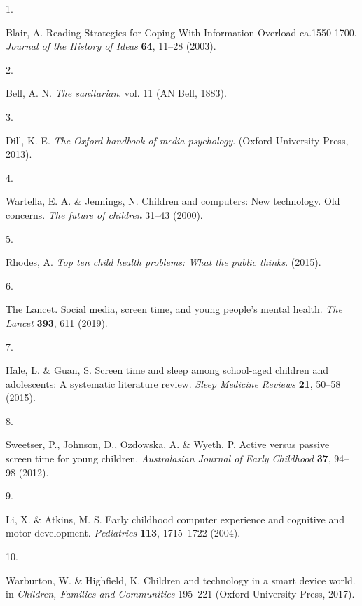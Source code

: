 \documentclass[
  english,
  man]{apa6}
\newlength{\cslhangindent}
\newlength{\csllabelwidth}
\newenvironment{CSLReferences}[2] %
 {%
  \setlength{\parindent}{0pt}
  \ifodd #1 \everypar{\setlength{\hangindent}{\cslhangindent}}\ignorespaces\fi
  \ifnum #2 > 0
  \setlength{\parskip}{#2\baselineskip}
  \fi
 }%
 {}
\newcommand{\CSLLeftMargin}[1]{\parbox[t]{\csllabelwidth}{#1}}
\newcommand{\CSLRightInline}[1]{\parbox[t]{\linewidth - \csllabelwidth}{#1}\break}
\begin{document}
\hypertarget{refs}{}
\begin{CSLReferences}{0}{0}
\leavevmode{}%
\CSLLeftMargin{1. }
\CSLRightInline{Blair, A. Reading {Strategies} for {Coping With Information Overload} ca.1550-1700. \emph{Journal of the History of Ideas} \textbf{64}, 11--28 (2003).}

\leavevmode{}%
\CSLLeftMargin{2. }
\CSLRightInline{Bell, A. N. \emph{The sanitarian}. vol. 11 ({AN Bell}, 1883).}

\leavevmode{}%
\CSLLeftMargin{3. }
\CSLRightInline{Dill, K. E. \emph{The {Oxford} handbook of media psychology}. ({Oxford University Press}, 2013).}

\leavevmode{}%
\CSLLeftMargin{4. }
\CSLRightInline{Wartella, E. A. \& Jennings, N. Children and computers: {New} technology. {Old} concerns. \emph{The future of children} 31--43 (2000).}

\leavevmode{}%
\CSLLeftMargin{5. }
\CSLRightInline{Rhodes, A. \emph{Top ten child health problems: {What} the public thinks}. (2015).}

\leavevmode{}%
\CSLLeftMargin{6. }
\CSLRightInline{The Lancet. Social media, screen time, and young people's mental health. \emph{The Lancet} \textbf{393}, 611 (2019).}

\leavevmode{}%
\CSLLeftMargin{7. }
\CSLRightInline{Hale, L. \& Guan, S. Screen time and sleep among school-aged children and adolescents: {A} systematic literature review. \emph{Sleep Medicine Reviews} \textbf{21}, 50--58 (2015).}

\leavevmode{}%
\CSLLeftMargin{8. }
\CSLRightInline{Sweetser, P., Johnson, D., Ozdowska, A. \& Wyeth, P. Active versus passive screen time for young children. \emph{Australasian Journal of Early Childhood} \textbf{37}, 94--98 (2012).}

\leavevmode{}%
\CSLLeftMargin{9. }
\CSLRightInline{Li, X. \& Atkins, M. S. Early childhood computer experience and cognitive and motor development. \emph{Pediatrics} \textbf{113}, 1715--1722 (2004).}

\leavevmode{}%
\CSLLeftMargin{10. }
\CSLRightInline{Warburton, W. \& Highfield, K. Children and technology in a smart device world. in \emph{Children, {Families} and {Communities}} 195--221 ({Oxford University Press}, 2017).}


\end{CSLReferences}
\end{document}
